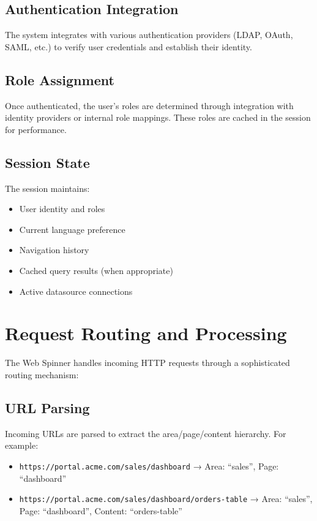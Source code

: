 \subsection{Authentication Integration}

The system integrates with various authentication providers (LDAP, OAuth, SAML, etc.) to verify user credentials and establish their identity.

\subsection{Role Assignment}

Once authenticated, the user's roles are determined through integration with identity providers or internal role mappings. These roles are cached in the session for performance.

\subsection{Session State}

The session maintains:
\begin{itemize}
    \item User identity and roles
    \item Current language preference
    \item Navigation history
    \item Cached query results (when appropriate)
    \item Active datasource connections
\end{itemize}

\section{Request Routing and Processing}
\label{sec:request-routing}

The Web Spinner handles incoming HTTP requests through a sophisticated routing mechanism:

\subsection{URL Parsing}

Incoming URLs are parsed to extract the area/page/content hierarchy. For example:
\begin{itemize}
    \item \texttt{https://portal.acme.com/sales/dashboard} → Area: ``sales'', Page: ``dashboard''
    \item \texttt{https://portal.acme.com/sales/dashboard/orders-table} → Area: ``sales'', Page: ``dashboard'', Content: ``orders-table''
\end{itemize}

